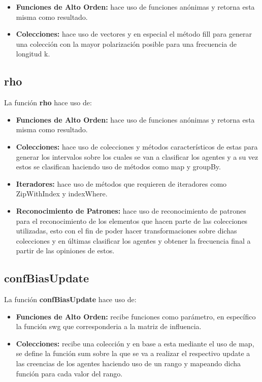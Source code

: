 \documentclass{article}
\begin{document}
    \begin{itemize}
      \item \textbf{Funciones de Alto Orden:} hace uso de funciones anónimas y retorna esta misma como resultado.
      \item \textbf{Colecciones:} hace uso de vectores y en especial el método fill para generar una colección con la mayor polarización posible para una frecuencia de longitud k.
    \end{itemize}

    \subsection{rho}
    La función \textbf{rho} hace uso de:

    \begin{itemize}
      \item \textbf{Funciones de Alto Orden:} hace uso de funciones anónimas y retorna esta misma como resultado.
      \item \textbf{Colecciones:} hace uso de colecciones y métodos característicos de estas para generar los intervalos sobre los cuales se van a clasificar los agentes y a su vez estos se clasifican haciendo uso de métodos como map y groupBy.
      \item \textbf{Iteradores:} hace uso de métodos que requieren de iteradores como ZipWithIndex y indexWhere.
      \item \textbf{Reconocimiento de Patrones:} hace uso de reconocimiento de patrones para el reconocimiento de los elementos que hacen parte de las colecciones utilizadas, esto con el fin de poder hacer transformaciones sobre dichas colecciones y en últimas clasificar los agentes y obtener la frecuencia final a partir de las opiniones de estos.
    \end{itemize}

    \subsection{confBiasUpdate}
    La función \textbf{confBiasUpdate} hace uso de:

    \begin{itemize}
      \item \textbf{Funciones de Alto Orden:} recibe funciones como parámetro, en específico la función swg que corresponderia a la matriz de influencia.
      \item \textbf{Colecciones:} recibe una colección y en base a esta mediante el uso de map, se define la función sum sobre la que se va a realizar el respectivo update a las creencias de los agentes haciendo uso de un rango y mapeando dicha función para cada valor del rango.
    \end{itemize}
\end{document}
